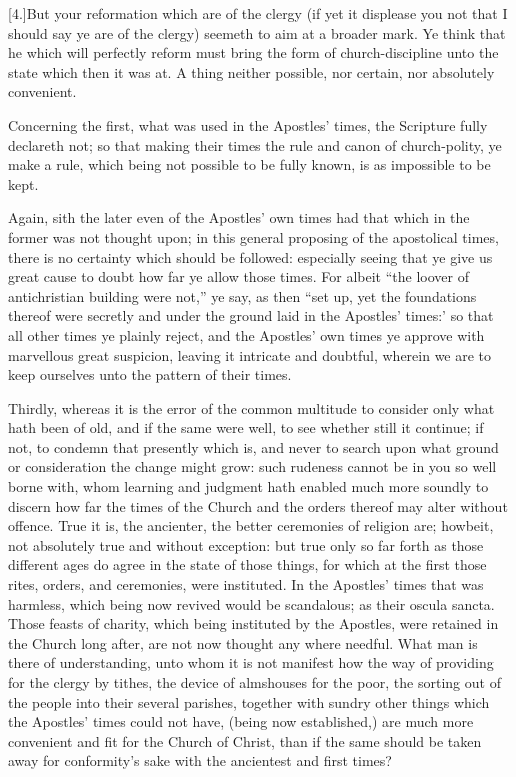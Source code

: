 [4.]But your reformation which are of the clergy (if yet it displease you not that I should say ye are of the clergy) seemeth to aim at a broader mark. Ye think that he which will perfectly reform must bring the form of church-discipline unto the state which then it was at. A thing neither possible, nor certain, nor absolutely convenient.

Concerning the first, what was used in the Apostles’ times, the Scripture fully declareth not; so that making their times the rule and canon of church-polity, ye make a rule, which being not possible to be fully known, is as impossible to be kept.

Again, sith the later even of the Apostles’ own times had that which in the former was not thought upon; in this general proposing of the apostolical times, there is no certainty which should be followed: especially seeing that ye give us great cause to doubt how far ye allow those times. For albeit “the loover of antichristian building were not,” ye say, as then “set up, yet the foundations thereof were secretly and under the ground laid in the Apostles’ times:’ so that all other times ye plainly reject, and the Apostles’ own times ye approve with marvellous great suspicion, leaving it intricate and doubtful, wherein we are to keep ourselves unto the pattern of their times.

Thirdly, whereas it is the error of the common multitude to consider only what hath been of old, and if the same were well, to see whether still it continue; if not, to condemn that presently which is, and never to search upon what ground or consideration the change might grow: such rudeness cannot be in you so well borne with, whom learning and judgment hath enabled much more soundly to discern how far the times of the Church and the orders thereof may alter without offence. True it is, the ancienter, the better ceremonies of religion are; howbeit, not absolutely true and without exception: but true only so far forth as those different ages do agree in the state of those things, for which at the first those rites, orders, and ceremonies, were instituted. In the Apostles’ times that was harmless, which being now revived would be scandalous; as their oscula sancta. Those feasts of charity, which being instituted by the Apostles, were retained in the Church long after, are not now thought any where needful. What man is there of understanding, unto whom it is not manifest how the way of providing for the clergy by tithes, the device of almshouses for the poor, the sorting out of the people into their several parishes, together with sundry other things which the Apostles’ times could not have, (being now established,) are much more convenient and fit for the Church of Christ, than if the same should be taken away for conformity’s sake with the ancientest and first times?

